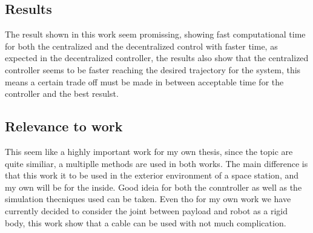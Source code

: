 \documentclass[a4paper,12pt]{article}
\begin{document}
\subsection{Results}
The result shown in this work seem promissing, showing fast computational time for both the centralized and the decentralized control with faster time, as expected in the decentralized controller, the results also show that the centralized controller seems to be faster reaching the desired trajectory for the system, this means a certain trade off must be made in between acceptable time for the controller and the best resulst.

\subsection{Relevance to work}
This seem like a highly important work for my own thesis, since the topic are quite similiar, a multiplle methods are used in both works. The main difference is that this work it to be used in the exterior environment of a space station, and my own will be for the inside. Good ideia for both the conntroller as well as the simulation thecniques used can be taken. Even tho for my own work we have currently decided to consider the joint between payload and robot as a rigid body, this work show that a cable can be used with not much complication.


\clearpage

\printbibliography
\end{document}
